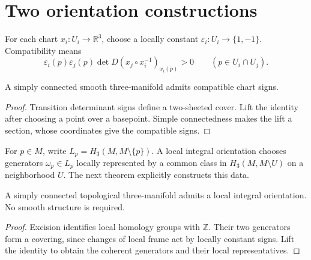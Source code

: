 \section{Two orientation constructions}
\label{sec:foundations-orientation}

\begin{definition}
\label{def:foundations-chart-signs}
For each chart $x_i:U_i\to\mathbb R^3$, choose a locally constant
$\varepsilon_i:U_i\to\{1,-1\}$. Compatibility means
\[
 \varepsilon_i(p)\varepsilon_j(p)
 \det D(x_j\circ x_i^{-1})_{x_i(p)}>0
 \qquad(p\in U_i\cap U_j).
\]
\end{definition}

\begin{lemma}
\label{lem:foundations-determinant-cover}
A simply connected smooth three-manifold admits compatible chart signs.
\end{lemma}
\begin{proof}
Transition determinant signs define a two-sheeted cover. Lift the
identity after choosing a point over a basepoint. Simple connectedness
makes the lift a section, whose coordinates give the compatible signs.
\end{proof}

\label{def:foundations-local-orientation}
For $p\in M$, write $L_p=H_3(M,M\setminus\{p\})$.
A local integral orientation chooses generators $\omega_p\in L_p$
locally represented by a common class in $H_3(M,M\setminus U)$ on
a neighborhood $U$. The next theorem explicitly constructs this data.

\begin{lemma}
\label{lem:foundations-coherent}
A simply connected topological three-manifold admits a local integral
orientation. No smooth structure is required.
\end{lemma}
\begin{proof}
Excision identifies local homology groups with $\mathbb Z$. Their two
generators form a covering, since changes of local frame act by locally
constant signs. Lift the identity to obtain the coherent generators and
their local representatives.
\end{proof}

